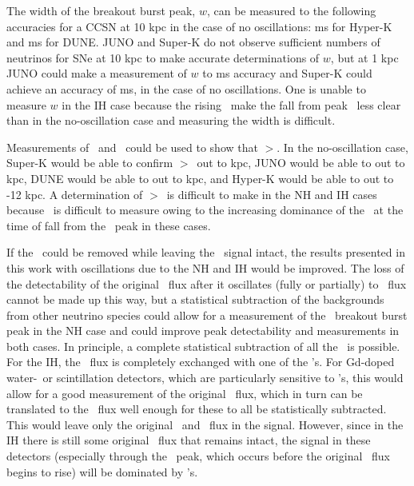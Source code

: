 The width of the breakout burst peak, $w$, can be measured to the
following accuracies for a CCSN at 10 kpc in the case of no
oscillations:  ms for Hyper-K and  ms for DUNE.  JUNO and Super-K do not observe sufficient numbers of
neutrinos for SNe at 10 kpc to make accurate determinations of
$w$, but at 1 kpc JUNO could make a measurement of $w$ to  ms
accuracy and Super-K could achieve an accuracy of  ms, in the case of no oscillations.  One is unable to measure
$w$ in the IH case because the rising \backgrounds\ make the fall from
peak \nue\ less clear than in the no-oscillation case and measuring
the width is difficult.

Measurements of \trise\ and \tfall\ could be used
to show that \tfall$>$\trise.    In the
no-oscillation case, 
Super-K would be able to confirm  \tfall$>$\trise\ out to  kpc, JUNO would be able to out to  kpc, 
DUNE would be able to out to  kpc, and Hyper-K would be able to
out to -12 kpc.  A
determination of \tfall$>$\trise\ is difficult to make in the NH and
IH cases because \tfall\ is difficult to measure owing to  
the increasing dominance of the \backgrounds\ at
the time of fall from the \nue\ peak in these cases.



If the \backgrounds\ could be removed while leaving the \nue\ signal intact, 
the results presented in this work with oscillations due to the NH and
IH would be improved.
 The loss of the detectability of the
original \nue\ flux after it oscillates (fully or partially) to
\nuxpart\ flux cannot be made up this way, but a statistical subtraction
of the backgrounds from other neutrino species could allow for a
measurement of the \nue\ breakout burst peak in the NH case and could improve peak detectability
and measurements in both cases.  In principle, a complete statistical
subtraction of all the \backgrounds\ is possible.
For the IH, the \anue\ flux is completely exchanged with one of 
the \nuxanti's.  For Gd-doped water-\cer\ or scintillation detectors,
which are particularly sensitive to \anue's,
this would allow for a good measurement of the original \nuxanti\ flux, 
which in turn can be translated to the \nuxpart\ flux well enough for
these to all be statistically subtracted.  This would leave only the
original \nue\ and \anue\ flux in the signal.
 However, since in the IH there is still some original \nue\ flux 
that remains intact, the signal in these detectors (especially through
the \nue\ peak, which occurs before the original \anue\ flux begins to
rise) will be dominated by \nue's.

